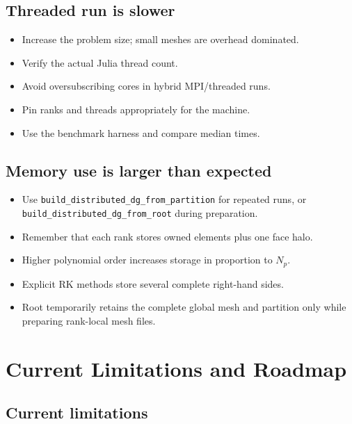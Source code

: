 \documentclass[11pt,oneside]{book}
\newcommand{\code}[1]{\texttt{#1}}
\begin{document}
\section{Threaded run is slower}

\begin{itemize}[leftmargin=*]
  \item Increase the problem size; small meshes are overhead dominated.
  \item Verify the actual Julia thread count.
  \item Avoid oversubscribing cores in hybrid MPI/threaded runs.
  \item Pin ranks and threads appropriately for the machine.
  \item Use the benchmark harness and compare median times.
\end{itemize}

\section{Memory use is larger than expected}

\begin{itemize}[leftmargin=*]
  \item Use \code{build\_distributed\_dg\_from\_partition} for repeated runs,
        or \code{build\_distributed\_dg\_from\_root} during preparation.
  \item Remember that each rank stores owned elements plus one face halo.
  \item Higher polynomial order increases storage in proportion to $N_p$.
  \item Explicit RK methods store several complete right-hand sides.
  \item Root temporarily retains the complete global mesh and partition only
        while preparing rank-local mesh files.
\end{itemize}

\chapter{Current Limitations and Roadmap}

\section{Current limitations}
\end{document}
